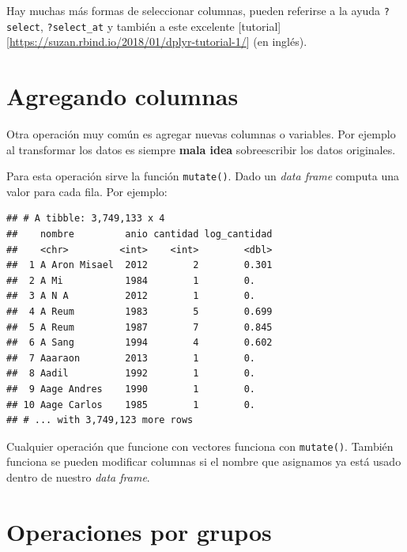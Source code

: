 \documentclass[]{book}
\newenvironment{Shaded}{\begin{snugshade}}{\end{snugshade}}
\newcommand{\DataTypeTok}[1]{\textcolor[rgb]{0.13,0.29,0.53}{#1}}
\newcommand{\KeywordTok}[1]{\textcolor[rgb]{0.13,0.29,0.53}{\textbf{#1}}}
\newcommand{\NormalTok}[1]{#1}
\newcommand{\OperatorTok}[1]{\textcolor[rgb]{0.81,0.36,0.00}{\textbf{#1}}}
\newcommand{\StringTok}[1]{\textcolor[rgb]{0.31,0.60,0.02}{#1}}
\theoremstyle{definition}
\theoremstyle{definition}
\theoremstyle{definition}
\theoremstyle{remark}
\begin{document}
Hay muchas más formas de seleccionar columnas, pueden referirse a la
ayuda \texttt{?select}, \texttt{?select\_at} y también a este excelente
{[}tutorial{]}{[}\url{https://suzan.rbind.io/2018/01/dplyr-tutorial-1/}{]}
(en inglés).

\hypertarget{agregando-columnas}{%
\section{Agregando columnas}\label{agregando-columnas}}

Otra operación muy común es agregar nuevas columnas o variables. Por
ejemplo al transformar los datos es siempre \textbf{mala idea}
sobreescribir los datos originales.

Para esta operación sirve la función \texttt{mutate()}. Dado un
\emph{data frame} computa una valor para cada fila. Por ejemplo:

\begin{Shaded}
\end{Shaded}

\begin{verbatim}
## # A tibble: 3,749,133 x 4
##    nombre         anio cantidad log_cantidad
##    <chr>         <int>    <int>        <dbl>
##  1 A Aron Misael  2012        2        0.301
##  2 A Mi           1984        1        0.   
##  3 A N A          2012        1        0.   
##  4 A Reum         1983        5        0.699
##  5 A Reum         1987        7        0.845
##  6 A Sang         1994        4        0.602
##  7 Aaaraon        2013        1        0.   
##  8 Aadil          1992        1        0.   
##  9 Aage Andres    1990        1        0.   
## 10 Aage Carlos    1985        1        0.   
## # ... with 3,749,123 more rows
\end{verbatim}

Cualquier operación que funcione con vectores funciona con
\texttt{mutate()}. También funciona se pueden modificar columnas si el
nombre que asignamos ya está usado dentro de nuestro \emph{data frame}.

\hypertarget{operaciones-por-grupos}{%
\section{Operaciones por grupos}\label{operaciones-por-grupos}}
\end{document}
